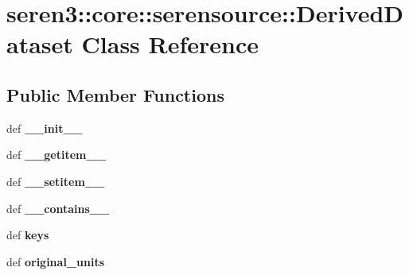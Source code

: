 \hypertarget{classseren3_1_1core_1_1serensource_1_1DerivedDataset}{
\section{seren3::core::serensource::DerivedDataset Class Reference}
\label{classseren3_1_1core_1_1serensource_1_1DerivedDataset}
}
\subsection*{Public Member Functions}
\begin{DoxyCompactItemize}
\item 
\hypertarget{classseren3_1_1core_1_1serensource_1_1DerivedDataset_a29d38121ef63d31e1933453cccd4b7a4}{
def {\bfseries \_\-\_\-init\_\-\_\-}}
\label{classseren3_1_1core_1_1serensource_1_1DerivedDataset_a29d38121ef63d31e1933453cccd4b7a4}

\item 
\hypertarget{classseren3_1_1core_1_1serensource_1_1DerivedDataset_a981e9afe701d4534e0108573fe3f7c30}{
def {\bfseries \_\-\_\-getitem\_\-\_\-}}
\label{classseren3_1_1core_1_1serensource_1_1DerivedDataset_a981e9afe701d4534e0108573fe3f7c30}

\item 
\hypertarget{classseren3_1_1core_1_1serensource_1_1DerivedDataset_a090eb7d4067a38bc32737740d4c099e8}{
def {\bfseries \_\-\_\-setitem\_\-\_\-}}
\label{classseren3_1_1core_1_1serensource_1_1DerivedDataset_a090eb7d4067a38bc32737740d4c099e8}

\item 
\hypertarget{classseren3_1_1core_1_1serensource_1_1DerivedDataset_a90ff926ded4267ffc7115f35646edddc}{
def {\bfseries \_\-\_\-contains\_\-\_\-}}
\label{classseren3_1_1core_1_1serensource_1_1DerivedDataset_a90ff926ded4267ffc7115f35646edddc}

\item 
\hypertarget{classseren3_1_1core_1_1serensource_1_1DerivedDataset_a278e0de1532b491a8b012745eab2a78c}{
def {\bfseries keys}}
\label{classseren3_1_1core_1_1serensource_1_1DerivedDataset_a278e0de1532b491a8b012745eab2a78c}

\item 
\hypertarget{classseren3_1_1core_1_1serensource_1_1DerivedDataset_a5bccb133038216d308599cf5daa8aa92}{
def {\bfseries original\_\-units}}
\label{classseren3_1_1core_1_1serensource_1_1DerivedDataset_a5bccb133038216d308599cf5daa8aa92}


\end{DoxyCompactItemize}
